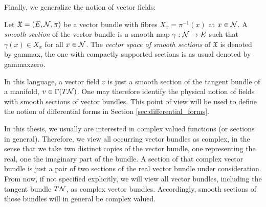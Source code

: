 %
Finally, we generalize the notion of vector fields:
\begin{definition}
Let $\mathfrak{X}=(E,\mathcal{N},\pi)$ be a vector bundle with fibres $X_x=\pi^{-1}(x)$ at $x \in \mathcal{N}$. A \emph{smooth section} of the vector bundle is a smooth map $\gamma : \mathcal{N} \to E$ such that $\gamma(x) \in X_x$ for all $x \in \mathcal{N}$. The \emph{vector space of smooth sections} of $\mathfrak{X}$ is denoted by \gls{gammax}, the one with compactly supported sections is as usual denoted by \gls{gammaxzero}.
\end{definition}
In this language, a vector field $v$ is just a smooth section of the tangent bundle of a manifold, $v \in \Gamma(T\mathcal{N})$. One may therefore identify the physical notion of fields with smooth sections of vector bundles. This point of view will be used to define the notion of differential forms in Section \ref{sec:differential_forms}.\par
In this thesis, we usually are interested in complex valued functions (or sections in general). Therefore, we view all occurring vector bundles as complex, in the sense that we take two distinct copies of the vector bundle, one representing the real, one the imaginary part of the bundle. A section of that complex vector bundle is just a pair of two sections of the real vector bundle under consideration. From now, if not specified explicitly, we will view all vector bundles, including the tangent bundle $T\mathcal{N}$, as complex vector bundles. Accordingly, smooth sections of those bundles will in general be complex valued.
%
%
%
%
%
%
%
%
%
%
%
